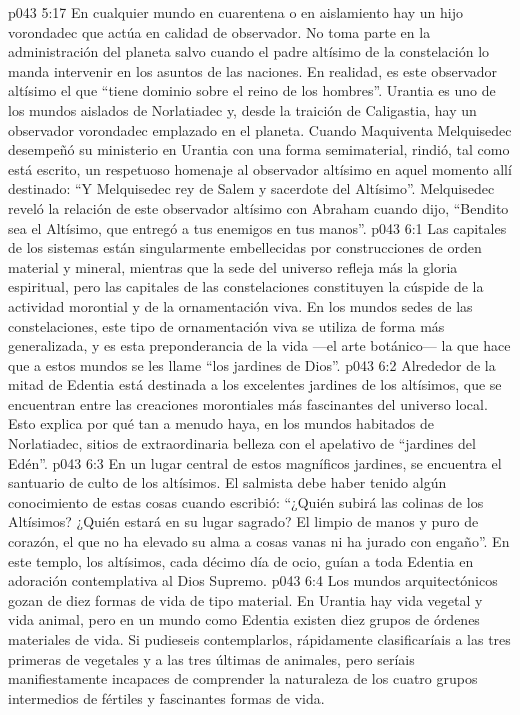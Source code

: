 \vs p043 5:17 En cualquier mundo en cuarentena o en aislamiento hay un hijo vorondadec que actúa en calidad de observador. No toma parte en la administración del planeta salvo cuando el padre altísimo de la constelación lo manda intervenir en los asuntos de las naciones. En realidad, es este observador altísimo el que “tiene dominio sobre el reino de los hombres”. Urantia es uno de los mundos aislados de Norlatiadec y, desde la traición de Caligastia, hay un observador vorondadec emplazado en el planeta. Cuando Maquiventa Melquisedec desempeñó su ministerio en Urantia con una forma semimaterial, rindió, tal como está escrito, un respetuoso homenaje al observador altísimo en aquel momento allí destinado: “Y Melquisedec rey de Salem y sacerdote del Altísimo”. Melquisedec reveló la relación de este observador altísimo con Abraham cuando dijo, “Bendito sea el Altísimo, que entregó a tus enemigos en tus manos”.
\vs p043 6:1 Las capitales de los sistemas están singularmente embellecidas por construcciones de orden material y mineral, mientras que la sede del universo refleja más la gloria espiritual, pero las capitales de las constelaciones constituyen la cúspide de la actividad morontial y de la ornamentación viva. En los mundos sedes de las constelaciones, este tipo de ornamentación viva se utiliza de forma más generalizada, y es esta preponderancia de la vida ---el arte botánico--- la que hace que a estos mundos se les llame “los jardines de Dios”.
\vs p043 6:2 \pc Alrededor de la mitad de Edentia está destinada a los excelentes jardines de los altísimos, que se encuentran entre las creaciones morontiales más fascinantes del universo local. Esto explica por qué tan a menudo haya, en los mundos habitados de Norlatiadec, sitios de extraordinaria belleza con el apelativo de “jardines del Edén”.
\vs p043 6:3 En un lugar central de estos magníficos jardines, se encuentra el santuario de culto de los altísimos. El salmista debe haber tenido algún conocimiento de estas cosas cuando escribió: “¿Quién subirá las colinas de los Altísimos? ¿Quién estará en su lugar sagrado? El limpio de manos y puro de corazón, el que no ha elevado su alma a cosas vanas ni ha jurado con engaño”. En este templo, los altísimos, cada décimo día de ocio, guían a toda Edentia en adoración contemplativa al Dios Supremo.
\vs p043 6:4 \pc Los mundos arquitectónicos gozan de diez formas de vida de tipo material. En Urantia hay vida vegetal y vida animal, pero en un mundo como Edentia existen diez grupos de órdenes materiales de vida. Si pudieseis contemplarlos, rápidamente clasificaríais a las tres primeras de vegetales y a las tres últimas de animales, pero seríais manifiestamente incapaces de comprender la naturaleza de los cuatro grupos intermedios de fértiles y fascinantes formas de vida.
